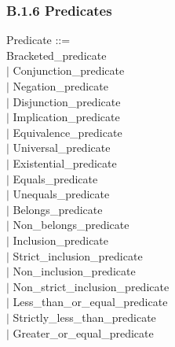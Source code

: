 \documentclass[12pt,a4paper,draft]{article}
\begin{document}
{\begin{sloppypar}
\subsubsection{B.1.6 Predicates}
\noindent Predicate ::= \\
\hspace*{0.20in}   Bracketed\_predicate\\
\hspace*{0.20in} $|$  Conjunction\_predicate\\
\hspace*{0.20in} $|$  Negation\_predicate\\
\hspace*{0.20in} $|$  Disjunction\_predicate\\
\hspace*{0.20in} $|$  Implication\_predicate\\
\hspace*{0.20in} $|$  Equivalence\_predicate\\
\hspace*{0.20in} $|$  Universal\_predicate\\
\hspace*{0.20in} $|$  Existential\_predicate\\
\hspace*{0.20in} $|$  Equals\_predicate\\
\hspace*{0.20in} $|$  Unequals\_predicate\\
\hspace*{0.20in} $|$  Belongs\_predicate\\
\hspace*{0.20in} $|$  Non\_belongs\_predicate\\
\hspace*{0.20in} $|$  Inclusion\_predicate\\
\hspace*{0.20in} $|$  Strict\_inclusion\_predicate\\
\hspace*{0.20in} $|$  Non\_inclusion\_predicate\\
\hspace*{0.20in} $|$  Non\_strict\_inclusion\_predicate\\
\hspace*{0.20in} $|$  Less\_than\_or\_equal\_predicate\\
\hspace*{0.20in} $|$  Strictly\_less\_than\_predicate\\
\hspace*{0.20in} $|$  Greater\_or\_equal\_predicate\\

\end{sloppypar}}
\end{document}
